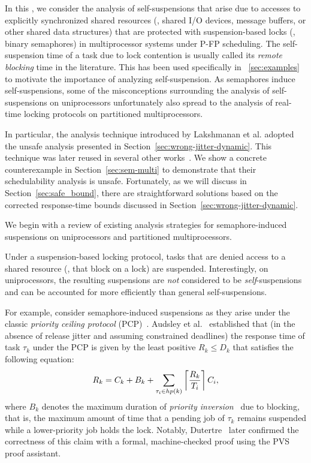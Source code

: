 \label{sec:syn}

In this \mysectionrefnormal{}, we consider the analysis of self-suspensions that arise due to accesses to explicitly synchronized shared resources (\eg, shared I/O devices, message buffers, or other shared data structures) that are protected with suspension-based locks (\eg, binary semaphores) in multiprocessor systems under P-FP scheduling. The self-suspension time of a task due to lock contention is  usually called its \emph{remote blocking} time in the literature. This has been used specifically in \mysectionref{}~\ref{sec:examples} to motivate the importance of analyzing self-suspension. 
As semaphores induce self-suspensions, some of the misconceptions surrounding the analysis of self-suspensions on uniprocessors unfortunately also spread to the analysis of  real-time locking protocols on partitioned multiprocessors.


In particular, the analysis technique introduced by Lakshmanan et al. \cite{lakshmanan-2009} adopted the unsafe analysis presented in Section~\ref{sec:wrong-jitter-dynamic}. This technique was later reused in several other works~\cite{zeng-2011,bbb-2013,yang-2013,kim-2014,han-2014,carminati-2014,yang-2014}. We show a concrete counterexample in Section~\ref{sec:sem-multi} to demonstrate that their schedulability analysis is unsafe. Fortunately, as we will discuss in Section~\ref{sec:safe_bound}, there are straightforward solutions based on the corrected response-time bounds discussed in Section~\ref{sec:wrong-jitter-dynamic}.

We begin with a review of existing analysis strategies for semaphore-induced suspensions on uniprocessors and partitioned multiprocessors. 
 

\label{sec:sem-uni}

Under a suspension-based locking protocol, tasks that are denied access to a shared resource (\ie, that block on a lock) are suspended. Interestingly, on uniprocessors, the resulting suspensions are \emph{not} considered to be \emph{self}-suspensions and can be accounted for more efficiently than general self-suspensions.

For example, consider semaphore-induced suspensions as they arise under the classic \emph{priority ceiling protocol} (PCP)~\cite{SRL:90}. Audsley et al.~\cite{audsley-1993} established that (in the absence of release jitter and assuming constrained deadlines) the response time of task $\tau_k$ under the PCP is given by the least positive $R_k \leq D_k$ that satisfies the following equation:
\begin{equation}
R_k = C_k+ B_k+\sum_{\tau_i \in hp(k)}\left\lceil{\frac{R_k}{T_i}}\right\rceil C_i,
\label{eq:classic-pcp-rta}
\end{equation}
where $B_k$ denotes the maximum duration of \emph{priority inversion}~\cite{SRL:90} due to blocking, that is, the maximum amount of time that a pending job of $\tau_k$ remains suspended while a lower-priority job holds the lock. Notably, Dutertre~\cite{Du:99} later confirmed the correctness of this claim  with a formal, machine-checked proof using the PVS proof assistant. 

